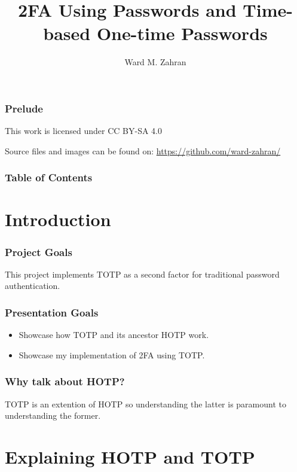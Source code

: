 \documentclass{beamer}
\title{2FA Using Passwords and Time-based One-time Passwords}
\institute{University of Jordan}
\author{Ward M. Zahran}
\begin{document}
\frame{\titlepage}

\begin{frame}

    \frametitle{Prelude}
    This work is licensed under CC BY-SA 4.0

    Source files and images can be found on:
    \href{https://github.com/ward-zahran/}{https://github.com/ward-zahran/}

\end{frame}

\begin{frame}
    \frametitle{Table of Contents}
    \tableofcontents
\end{frame}

\section{Introduction}
\begin{frame}

    \frametitle{Project Goals}
    This project implements TOTP as a second factor for traditional password authentication. 

\end{frame}

\begin{frame}

    \frametitle{Presentation Goals}
    \begin{itemize}
        \item 
            Showcase how TOTP and its ancestor HOTP work. 
        \item 
            Showcase my implementation of 2FA using TOTP.
    \end{itemize}

\end{frame}

\begin{frame}

    \frametitle{Why talk about HOTP?}
    TOTP is an extention of HOTP so understanding the latter is paramount to understanding the former.
\end{frame}

\section{Explaining HOTP and TOTP}
\end{document}
